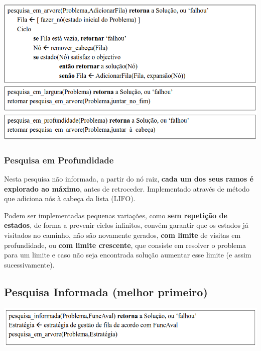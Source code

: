 \documentclass{article}
\begin{document}
\begin{center}
  \includegraphics[scale=0.33]{53}
\end{center}

\pagebreak

\subsubsection{Pesquisa em Profundidade}

Nesta pesquisa não informada, a partir do nó raiz, \textbf{cada um dos seus ramos é explorado ao
máximo}, antes de retroceder. Implementado através de método que adiciona nós à cabeça da lista (LIFO).

\vspace{2mm}

Podem ser implementadas pequenas variações, como \textbf{sem repetição de estados}, de forma a
prevenir ciclos infinitos, convém garantir que os estados já visitados no caminho, não são novamente gerados, \textbf{com limite} de visitas em profundidade, ou \textbf{com limite crescente}, que
consiste em resolver o problema para um limite e caso não seja encontrada solução aumentar
esse limite (e assim sucessivamente).

\subsection{Pesquisa Informada (melhor primeiro)}

\begin{center}
  \includegraphics[scale=0.35]{54}
\end{center}
\end{document}
